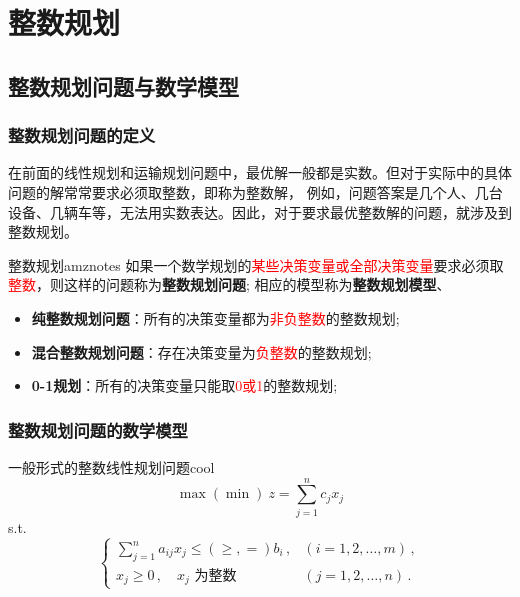 \ifx\allfiles\undefined

	
	
\else
\fi
    \chapter{整数规划}
    \section{整数规划问题与数学模型}
    \subsection{整数规划问题的定义}
    在前面的线性规划和运输规划问题中，最优解一般都是实数。但对于实际中的具体问题的解常常要求必须取整数，即称为整数解，
例如，问题答案是几个人、几台设备、几辆车等，无法用实数表达。因此，对于要求最优整数解的问题，就涉及到整数规划。
\begin{dfnbox}{整数规划}{amznotes}
    如果一个数学规划的\textcolor{red}{某些决策变量或全部决策变量}要求必须取\textcolor{red}{整数}，则这样的问题称为\textbf{整数规划问题};
相应的模型称为\textbf{整数规划模型}、
\end{dfnbox}
\begin{itemize}
    \item \textbf{纯整数规划问题}：所有的决策变量都为\textcolor{red}{非负整数}的整数规划;
    \item \textbf{混合整数规划问题}：存在决策变量为\textcolor{red}{负整数}的整数规划;
    \item \textbf{0-1规划}：所有的决策变量只能取\textcolor{red}{0或1}的整数规划;
\end{itemize}

\subsection{整数规划问题的数学模型}

\begin{thmbox}{一般形式的整数线性规划问题}{cool}
    \[
    \max(\min) \ z = \sum_{j=1}^{n} c_j x_j
    \]
    s.t.
    \[
    \begin{cases}
        \sum_{j=1}^{n} a_{ij} x_j \leq (\geq, =) b_i \,, & (i=1,2,\dots,m) \,, \\
        x_j \geq 0 \,, \quad x_j \text{ 为整数} & (j=1,2,\dots,n) \,.
    \end{cases}
    \]
\end{thmbox}

